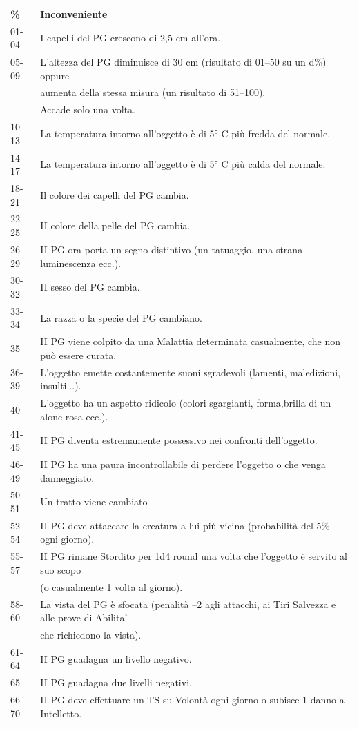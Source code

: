 \documentclass[a4paper,11pt,twoside,openany]{book}
\begin{document}
\begin{tabular}{ll}
	\toprule
	\textbf{\%} & \textbf{Inconveniente}\tabularnewline
	01-04       & I capelli del PG crescono di 2,5 cm all'ora.\tabularnewline
	05-09       & L'altezza del PG diminuisce di 30 cm (risultato di 01--50
	su un d\%) oppure                                                                                                      \\
	            & aumenta della stessa misura (un risultato di 51--100).                                                   \\
	            & Accade solo una volta.\tabularnewline
	10-13       & La temperatura intorno all'oggetto è di 5° C più fredda del normale.\tabularnewline
	14-17       & La temperatura intorno all'oggetto è di 5° C più calda del normale.\tabularnewline
	18-21       & Il colore dei capelli del PG cambia.\tabularnewline
	22-25       & II colore della pelle del PG cambia.\tabularnewline
	26-29       & II PG ora porta un segno distintivo (un tatuaggio, una strana
	luminescenza ecc.).\tabularnewline
	30-32       & II sesso del PG cambia.\tabularnewline
	33-34       & La razza o la specie del PG cambiano.\tabularnewline
	35          & II PG viene colpito da una Malattia determinata casualmente,
	che non può essere curata.\tabularnewline
	36-39       & L'oggetto emette costantemente suoni sgradevoli (lamenti, maledizioni, insulti...).\tabularnewline
	40          & L'oggetto ha un aspetto ridicolo (colori sgargianti, forma,brilla di un alone rosa ecc.).\tabularnewline
	41-45       & II PG diventa estremamente possessivo nei confronti dell'oggetto.\tabularnewline
	46-49       & II PG ha una paura incontrollabile di perdere l'oggetto o che venga danneggiato.\tabularnewline
	50-51       & Un tratto viene cambiato\tabularnewline
	52-54       & II PG deve attaccare la creatura a lui più vicina (probabilità del 5\% ogni giorno).\tabularnewline
	55-57       & II PG rimane Stordito per 1d4 round una volta che l'oggetto è servito al suo scopo                       \\
	            & (o casualmente 1 volta al giorno).\tabularnewline
	58-60       & La vista del PG è sfocata (penalità --2 agli attacchi, ai Tiri Salvezza e alle prove di Abilita'         \\
	            & che richiedono la vista).\tabularnewline
	61-64       & II PG guadagna un livello negativo.\tabularnewline
	65          & II PG guadagna due livelli negativi.\tabularnewline
	66-70       & II PG deve effettuare un TS su Volontà ogni giorno o subisce 1 danno a Intelletto.\tabularnewline

\end{tabular}
\end{document}
